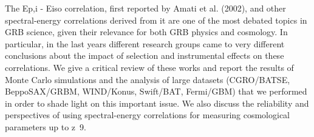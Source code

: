 


\bigskip



\bigskip

\noindent The Ep,i - Eiso correlation, first reported by Amati et al. (2002), and other spectral-energy correlations derived from it are one of the most debated topics in GRB science, given their relevance for both GRB physics and cosmology. In particular, in the last years different research groups came to very different conclusions about the impact of selection and instrumental effects on these correlations. We give a critical review of these works and report the results of Monte Carlo simulations and the analysis of large datasets (CGRO/BATSE, BeppoSAX/GRBM, WIND/Konus, Swift/BAT, Fermi/GBM) that we performed in order to shade light on this important issue. We also discuss the reliability and perspectives of using spectral-energy correlations for measuring cosmological parameters up to z~9.

